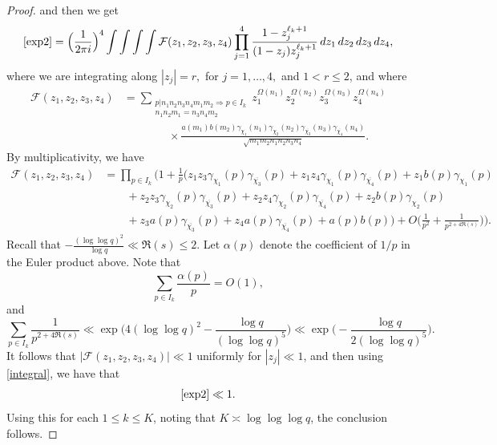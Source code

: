 \documentclass[12pt, reqno]{amsart}
\numberwithin{equation}{section}
\numberwithin{theorem}{section}
\numberwithin{equation}{section}
\begin{document}
\begin{proof}
    and then we get
    \begin{equation} \label{integral} \eqref{exp2} = \Big( \frac{1}{2 \pi i} \Big)^4 \int \int \int \int \mathcal{F}(z_1,z_2,z_3,z_4) \prod_{j=1}^4 \frac{1-z_j^{\ell_k+1}}{(1-z_j)z_j^{\ell_k+1}} \, dz_1 \, dz_2 \, dz_3 \, dz_4, 
    \end{equation} where we are integrating along $|z_j|=r,$ for $j=1,\ldots,4,$ and $1<r \leq 2$, and where
    \begin{align*}
        \mathcal{F}  (z_1,z_2,z_3,z_4)&= \sum_{\substack{ p |n_1n_2n_3n_4m_1m_2 \Rightarrow p \in I_k \\ n_1n_2m_1=n_3n_4m_2 }} z_1^{\Omega(n_1)} z_2^{\Omega(n_2)} z_3^{\Omega(n_3)} z_4^{\Omega(n_4)} \\
        & \qquad\qquad\times \frac{ a(m_1) b(m_2)\gamma_{\chi_1}(n_1) \gamma_{\chi_2}(n_2) \gamma_{\overline{\chi_3}}(n_3) \gamma_{\overline{\chi_4}}(n_4) }{\sqrt{m_1m_2n_1n_2n_3n_4}}.
    \end{align*}
    By multiplicativity, we have 
    \begin{align*}
     \mathcal{F} (z_1,z_2,z_3,z_4)&=  \prod_{p \in I_k} \bigg(1 + \frac{1}{p} \Big(  z_1 z_3 \gamma_{\chi_1}(p) \gamma_{\overline{\chi_3}}(p) + z_1 z_4 \gamma_{\chi_1}(p) \gamma_{\overline{\chi_4}}(p) +z_1 b(p) \gamma_{\chi_1}(p)  \\
     &\qquad + z_2z_3\gamma_{\chi_2}(p) \gamma_{\overline{\chi_3}}(p) + z_2 z_4 \gamma_{\chi_2}(p) \gamma_{\overline{\chi_4}}(p) + z_2b(p) \gamma_{\chi_2}(p)\\
     &\qquad + z_3a(p) \gamma_{\overline{\chi_3}}(p)+z_4a(p) \gamma_{\overline{\chi_4}}(p)  +a(p)b(p) \Big)  +O \Big( \frac{1}{p^2} + \frac{1}{p^{2+4\Re(s)}}\Big)\bigg)   . 
    \end{align*}
    Recall that $-\frac{(\log \log q)^2}{\log q} \ll \Re(s) \leq 2.$ Let $\alpha(p)$ denote the coefficient of $1/p$ in the Euler product above. Note that
    $$ \sum_{p \in I_k} \frac{\alpha(p)}{p} = O(1),$$
    and 
    $$ \sum_{p \in I_k } \frac{1}{p^{2+4\Re(s)}} \ll \exp\bigg(  4 (\log \log q)^2-  \frac{\log q}{(\log \log q)^{5}}\bigg) \ll \exp\bigg( -  \frac{\log q}{2(\log \log q)^{5}}\bigg).$$
    It follows that $|\mathcal{F}(z_1,z_2,z_3,z_4)| \ll 1$ uniformly for $|z_j| \ll 1$, and then using \eqref{integral}, we have that
    $$ \eqref{exp2} \ll 1.$$
    Using this for each $1 \leq k \leq K$, noting that $K\asymp \log\log\log q$, the conclusion follows. 
\end{proof}
\end{document}
